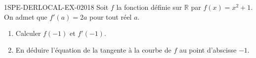 \begin{exercice}{1SPE-DERLOCAL-EX-020}{1}{8}
Soit $f$ la fonction définie sur $\mathbb{R}$ par $f(x) = x^2 + 1$. On admet que $f'(a) = 2a$ pour tout réel $a$.

\begin{enumerate}
  \item Calculer $f(-1)$ et $f'(-1)$.
  \item En déduire l'équation de la tangente à la courbe de $f$ au point d'abscisse $-1$.
\end{enumerate}
\end{exercice}

